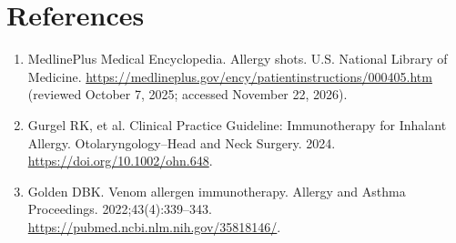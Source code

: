\section*{References}
\begin{enumerate}
  \item MedlinePlus Medical Encyclopedia. Allergy shots. U.S. National Library of Medicine. \url{https://medlineplus.gov/ency/patientinstructions/000405.htm} (reviewed October 7, 2025; accessed November 22, 2026).
  \item Gurgel RK, et al. Clinical Practice Guideline: Immunotherapy for Inhalant Allergy. Otolaryngology--Head and Neck Surgery. 2024. \url{https://doi.org/10.1002/ohn.648}.
  \item Golden DBK. Venom allergen immunotherapy. Allergy and Asthma Proceedings. 2022;43(4):339--343. \url{https://pubmed.ncbi.nlm.nih.gov/35818146/}.
\end{enumerate}

\clearpage
